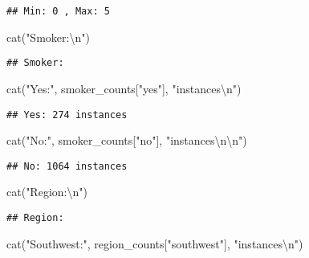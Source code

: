 \documentclass[
]{article}
\newenvironment{Shaded}{\begin{snugshade}}{\end{snugshade}}
\newcommand{\FunctionTok}[1]{\textcolor[rgb]{0.00,0.00,0.00}{#1}}
\newcommand{\NormalTok}[1]{#1}
\newcommand{\SpecialCharTok}[1]{\textcolor[rgb]{0.00,0.00,0.00}{#1}}
\newcommand{\StringTok}[1]{\textcolor[rgb]{0.31,0.60,0.02}{#1}}
\begin{document}
\begin{verbatim}
## Min: 0 , Max: 5
\end{verbatim}

\begin{Shaded}
\begin{Highlighting}[]
\FunctionTok{cat}\NormalTok{(}\StringTok{"Smoker:}\SpecialCharTok{\textbackslash{}n}\StringTok{"}\NormalTok{)}
\end{Highlighting}
\end{Shaded}

\begin{verbatim}
## Smoker:
\end{verbatim}

\begin{Shaded}
\begin{Highlighting}[]
\FunctionTok{cat}\NormalTok{(}\StringTok{"Yes:"}\NormalTok{, smoker\_counts[}\StringTok{"yes"}\NormalTok{], }\StringTok{"instances}\SpecialCharTok{\textbackslash{}n}\StringTok{"}\NormalTok{)}
\end{Highlighting}
\end{Shaded}

\begin{verbatim}
## Yes: 274 instances
\end{verbatim}

\begin{Shaded}
\begin{Highlighting}[]
\FunctionTok{cat}\NormalTok{(}\StringTok{"No:"}\NormalTok{, smoker\_counts[}\StringTok{"no"}\NormalTok{], }\StringTok{"instances}\SpecialCharTok{\textbackslash{}n\textbackslash{}n}\StringTok{"}\NormalTok{)}
\end{Highlighting}
\end{Shaded}

\begin{verbatim}
## No: 1064 instances
\end{verbatim}

\begin{Shaded}
\begin{Highlighting}[]
\FunctionTok{cat}\NormalTok{(}\StringTok{"Region:}\SpecialCharTok{\textbackslash{}n}\StringTok{"}\NormalTok{)}
\end{Highlighting}
\end{Shaded}

\begin{verbatim}
## Region:
\end{verbatim}

\begin{Shaded}
\begin{Highlighting}[]
\FunctionTok{cat}\NormalTok{(}\StringTok{"Southwest:"}\NormalTok{, region\_counts[}\StringTok{"southwest"}\NormalTok{], }\StringTok{"instances}\SpecialCharTok{\textbackslash{}n}\StringTok{"}\NormalTok{)}
\end{Highlighting}
\end{Shaded}
\end{document}
